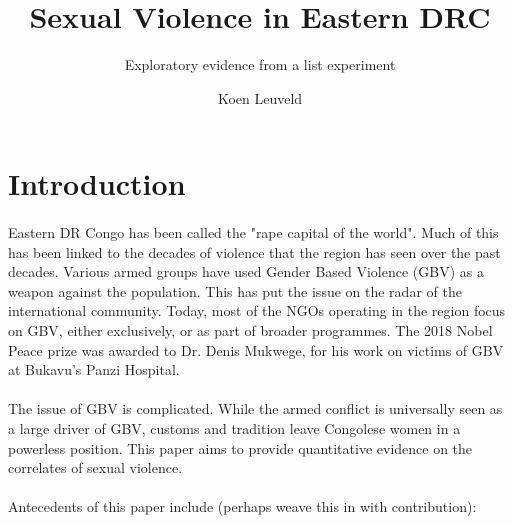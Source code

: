 \documentclass[11pt,a4paper]{scrartcl} %
\begin{document}
\author{Koen Leuveld}




\title{Sexual Violence in Eastern DRC}
\subtitle{Exploratory evidence from a list experiment} %

\maketitle



\section*{Introduction}

\paragraph{}
Eastern DR Congo has been called the "rape capital of the world". Much of this has been linked to the decades of violence that the region has seen over the past decades. Various armed groups have used Gender Based Violence (GBV) as a weapon against the population. This has put the issue on the radar of the international community. Today, most of the NGOs operating in the region focus on GBV, either exclusively, or as part of broader programmes. The 2018 Nobel Peace prize was awarded to Dr. Denis Mukwege, for his work on victims of GBV at Bukavu's Panzi Hospital.

\paragraph{}
The issue of GBV is complicated. While the armed conflict is universally seen as a large driver of GBV, customs and tradition leave Congolese women in a powerless position. This paper aims to provide quantitative evidence on the correlates of sexual violence.

\paragraph{}
Antecedents of this paper include (perhaps weave this in with contribution):
\end{document}
